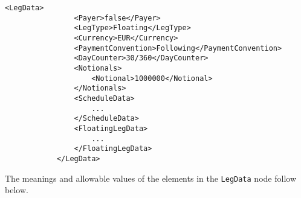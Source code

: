 \begin{lstlisting}[caption=LegData, label=lst:leg_data]
            <LegData>
                <Payer>false</Payer>
                <LegType>Floating</LegType>
                <Currency>EUR</Currency>
                <PaymentConvention>Following</PaymentConvention>
                <DayCounter>30/360</DayCounter>
                <Notionals>
                    <Notional>1000000</Notional>
                </Notionals>
                <ScheduleData>
                	...
                </ScheduleData>
                <FloatingLegData>
                	...
                </FloatingLegData>
            </LegData>
\end{lstlisting}

The meanings and allowable values of the elements in the \lstinline!LegData! node follow below.

